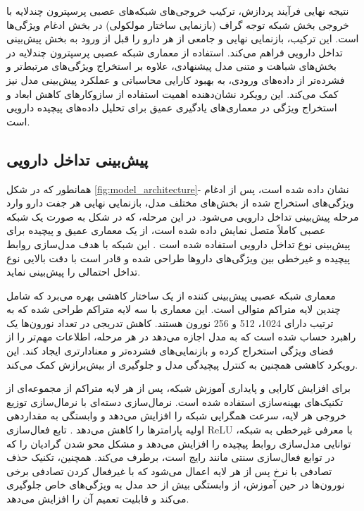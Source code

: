 نتیجه نهایی فرآیند پردازش، ترکیب خروجی‌های شبکه‌های عصبی پرسپترون چندلایه با خروجی بخش شبکه توجه گراف (بازنمایی ساختار مولکولی) در بخش ادغام ویژگی‌ها است. این ترکیب، بازنمایی نهایی و جامعی از هر دارو را قبل از ورود به بخش پیش‌بینی تداخل دارویی فراهم می‌کند. استفاده از معماری شبکه عصبی پرسپترون چندلایه در بخش‌های شباهت و متنی مدل پیشنهادی، علاوه بر استخراج ویژگی‌های مرتبط‌تر و فشرده‌تر از داده‌های ورودی، به بهبود کارایی محاسباتی و عملکرد پیش‌بینی مدل نیز کمک می‌کند. این رویکرد نشان‌دهنده اهمیت استفاده از سازوکار‌های کاهش ابعاد و استخراج ویژگی در معماری‌های یادگیری عمیق برای تحلیل داده‌های پیچیده دارویی است.

\subsection{پیش‌بینی تداخل دارویی}

همانطور که در شکل \ref{fig:model_architecture}- نشان داده شده است، پس از ادغام ویژگی‌های استخراج شده از بخش‌های مختلف مدل، بازنمایی نهایی هر جفت دارو وارد مرحله پیش‌بینی تداخل دارویی می‌شود. در این مرحله، که در شکل به صورت یک شبکه عصبی کاملاً متصل نمایش داده شده است، از یک معماری عمیق و پیچیده برای پیش‌بینی نوع تداخل دارویی استفاده شده است \cite{ref_dai2020}. این شبکه با هدف مدل‌سازی روابط پیچیده و غیرخطی بین ویژگی‌های داروها طراحی شده و قادر است با دقت بالایی نوع تداخل احتمالی را پیش‌بینی نماید.

معماری شبکه عصبی پیش‌بینی کننده از یک ساختار کاهشی بهره می‌برد که شامل چندین لایه متراکم متوالی است. این معماری با سه لایه متراکم طراحی شده که به ترتیب دارای 1024، 512 و 256 نورون هستند. کاهش تدریجی در تعداد نورون‌ها یک راهبرد حساب شده است که به مدل اجازه می‌دهد در هر مرحله، اطلاعات مهم‌تر را از فضای ویژگی استخراج کرده و بازنمایی‌های فشرده‌تر و معنادارتری ایجاد کند. این رویکرد کاهشی همچنین به کنترل پیچیدگی مدل و جلوگیری از بیش‌برازش کمک می‌کند.

برای افزایش کارایی و پایداری آموزش شبکه، پس از هر لایه متراکم از مجموعه‌ای از تکنیک‌های بهینه‌سازی استفاده شده است. نرمال‌سازی دسته‌ای با نرمال‌سازی توزیع خروجی هر لایه، سرعت همگرایی شبکه را افزایش می‌دهد و وابستگی به مقداردهی اولیه پارامترها را کاهش می‌دهد \cite{ref_dai2020}. تابع فعال‌سازی ReLU با معرفی غیرخطی به شبکه، توانایی مدل‌سازی روابط پیچیده را افزایش می‌دهد و مشکل محو شدن گرادیان را که در توابع فعال‌سازی سنتی مانند  رایج است، برطرف می‌کند. همچنین، تکنیک حذف تصادفی با نرخ  پس از هر لایه اعمال می‌شود که با غیرفعال کردن تصادفی برخی نورون‌ها در حین آموزش، از وابستگی بیش از حد مدل به ویژگی‌های خاص جلوگیری می‌کند و قابلیت تعمیم آن را افزایش می‌دهد.


